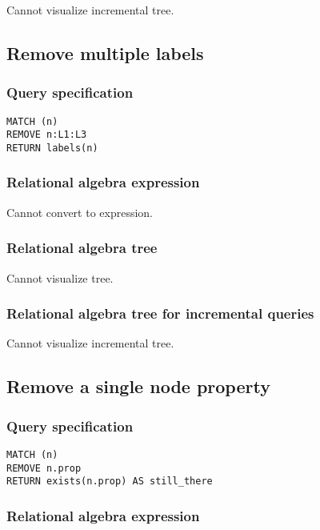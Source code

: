 Cannot visualize incremental tree.

\subsection{Remove multiple labels}

\subsubsection*{Query specification}

\begin{lstlisting}
MATCH (n)
REMOVE n:L1:L3
RETURN labels(n)
\end{lstlisting}

\subsubsection*{Relational algebra expression}

Cannot convert to expression.

\subsubsection*{Relational algebra tree}

Cannot visualize tree.

\subsubsection*{Relational algebra tree for incremental queries}

Cannot visualize incremental tree.

\subsection{Remove a single node property}

\subsubsection*{Query specification}

\begin{lstlisting}
MATCH (n)
REMOVE n.prop
RETURN exists(n.prop) AS still_there
\end{lstlisting}

\subsubsection*{Relational algebra expression}

